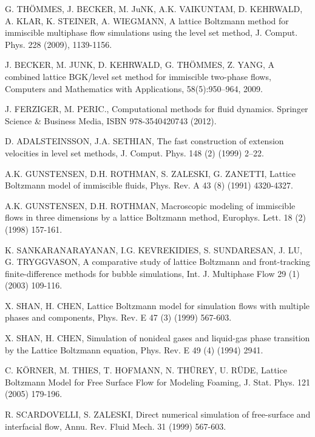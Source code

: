 \documentclass[final,leqno,onefignum,onetabnum]{siamltexmm}
\begin{document}
\begin{thebibliography}{1}	

 {\sc G. TH\"OMMES, J. BECKER, M. JuNK, A.K. VAIKUNTAM, D. KEHRWALD, A. KLAR, K. STEINER, A. WIEGMANN}, A lattice Boltzmann method for immiscible multiphase flow simulations using the level set method, J. Comput. Phys. 228 (2009), 1139-1156.

 {\sc J. BECKER, M. JUNK, D. KEHRWALD, G. TH\"OMMES, Z. YANG}, A combined lattice BGK/level set method for immiscible two-phase flows, Computers and Mathematics with Applications, 58(5):950–964, 2009.

 {\sc J. FERZIGER, M. PERIC.}, Computational methods for fluid dynamics. Springer Science \& Business Media, ISBN 978-3540420743 (2012).

 {\sc D. ADALSTEINSSON, J.A. SETHIAN}, The fast construction of extension velocities in level set methods, J. Comput. Phys. 148 (2) (1999) 2–22.

 {\sc A.K. GUNSTENSEN, D.H. ROTHMAN, S. ZALESKI, G. ZANETTI}, Lattice Boltzmann model of immiscible fluids, Phys. Rev. A 43 (8) (1991) 4320-4327.

 {\sc A.K. GUNSTENSEN, D.H. ROTHMAN}, Macroscopic modeling of immiscible flows in three dimensions by a lattice Boltzmann method, Europhys. Lett. 18 (2) (1998) 157-161.
	
 {\sc K. SANKARANARAYANAN, I.G. KEVREKIDIES, S. SUNDARESAN, J. LU, G. TRYGGVASON}, A comparative study of lattice Boltzmann and front-tracking finite-difference methods for bubble simulations, Int. J. Multiphase Flow 29 (1) (2003) 109-116.

 {\sc X. SHAN, H. CHEN}, Lattice Boltzmann model for simulation flows with multiple phases and components, Phys. Rev. E 47 (3) (1999) 567-603.

 {\sc X. SHAN, H. CHEN}, Simulation of nonideal gases and liquid-gas phase transition by the Lattice Boltzmann equation, Phys. Rev. E 49 (4) (1994) 2941.
	
 {\sc C. K\"ORNER, M. THIES, T. HOFMANN, N. TH\"UREY, U. R\"UDE}, Lattice Boltzmann Model for Free Surface Flow for Modeling Foaming, J. Stat. Phys. 121 (2005) 179-196.

 {\sc R. SCARDOVELLI, S. ZALESKI}, Direct numerical simulation of free-surface and interfacial flow, Annu. Rev. Fluid Mech. 31 (1999) 567-603.


\end{thebibliography}
\end{document}
